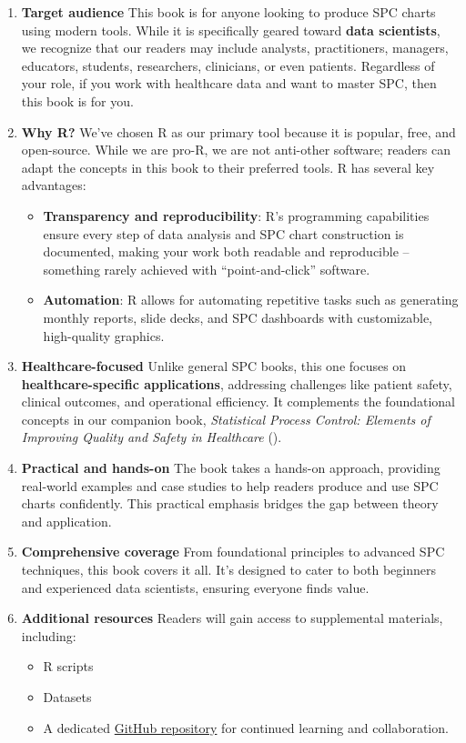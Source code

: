 \documentclass[
]{book}
\providecommand{\tightlist}{%
  \setlength{\itemsep}{0pt}\setlength{\parskip}{0pt}}
\begin{document}
\begin{enumerate}
\def\labelenumi{\arabic{enumi}.}
\item
  \textbf{Target audience}
  This book is for anyone looking to produce SPC charts using modern tools. While it is specifically geared toward \textbf{data scientists}, we recognize that our readers may include analysts, practitioners, managers, educators, students, researchers, clinicians, or even patients. Regardless of your role, if you work with healthcare data and want to master SPC, then this book is for you.
\item
  \textbf{Why R?}
  We've chosen R as our primary tool because it is popular, free, and open-source. While we are pro-R, we are not anti-other software; readers can adapt the concepts in this book to their preferred tools.
  R has several key advantages:

  \begin{itemize}
  \tightlist
  \item
    \textbf{Transparency and reproducibility}: R's programming capabilities ensure every step of data analysis and SPC chart construction is documented, making your work both readable and reproducible -- something rarely achieved with ``point-and-click'' software.
  \item
    \textbf{Automation}: R allows for automating repetitive tasks such as generating monthly reports, slide decks, and SPC dashboards with customizable, high-quality graphics.
  \end{itemize}
\item
  \textbf{Healthcare-focused}
  Unlike general SPC books, this one focuses on \textbf{healthcare-specific applications}, addressing challenges like patient safety, clinical outcomes, and operational efficiency. It complements the foundational concepts in our companion book, \emph{Statistical Process Control: Elements of Improving Quality and Safety in Healthcare} ().
\item
  \textbf{Practical and hands-on}
  The book takes a hands-on approach, providing real-world examples and case studies to help readers produce and use SPC charts confidently. This practical emphasis bridges the gap between theory and application.
\item
  \textbf{Comprehensive coverage}
  From foundational principles to advanced SPC techniques, this book covers it all. It's designed to cater to both beginners and experienced data scientists, ensuring everyone finds value.
\item
  \textbf{Additional resources}
  Readers will gain access to supplemental materials, including:

  \begin{itemize}
  \tightlist
  \item
    R scripts
  \item
    Datasets
  \item
    A dedicated \href{https://github.com/anhoej/spc4hc}{GitHub repository} for continued learning and collaboration.
  \end{itemize}
\end{enumerate}
\end{document}
